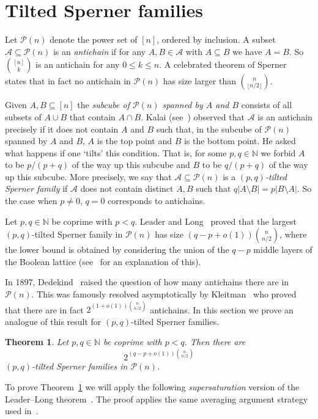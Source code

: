 \documentclass[11pt]{article}
\newtheorem{theorem}{Theorem}[section]
\numberwithin{equation}{section}
\def\A{\mathcal{A}}
\def\P{\mathcal{P}}
\begin{document}
\section{Tilted Sperner families}\label{sec:tilt}
Let $\P(n)$ denote the power set of $[n]$,  ordered by inclusion. A subset $\A \subseteq \P(n)$ is an \emph{antichain} if for any $A, B \in \A$ with $A \subseteq B$ we have $A = B$. So $\binom{[n]}{k}$ is an antichain for any $0 \leq k \leq n$. A celebrated theorem of  Sperner~\cite{sperner} states that in fact no antichain in $\P(n)$ has size larger than $\binom{n}{\lfloor n/2 \rfloor}$. 

Given $A,B \subseteq [n]$ the \emph{subcube of $\P(n)$ spanned by $A$ and $B$} consists of all subsets of $A\cup B$ that contain $A\cap B$.
Kalai (see~\cite{long}) observed that $\mathcal A$ is an antichain precisely if it does not contain $A$ and $B$ such that, in the subcube of $\P(n)$ spanned by $A$ and $B$, $A$ is the top point and $B$ is the bottom point. He asked what happens if one `tilts' this condition. That is, for some $p,q \in \mathbb N$ we forbid $A$ to be $p/(p+q)$ of the way up this subcube and $B$ to be $q/(p+q)$ of the way up this subcube.
More precisely, we say that $\A \subseteq \P(n)$ is a \emph{$(p,q)$-tilted Sperner family} if $\A$ does not contain distinct $A,B$ such that $q|A\setminus B|=p|B\setminus A|$. So the case when $p\not = 0$, $q=0$ corresponds to antichains. 


Let  $p,q\in \mathbb N$ be coprime with $p<q$. Leader and Long~\cite{long} proved that the largest $(p,q)$-tilted Sperner family in $\P(n)$ has size $(q-p+o(1))\binom{n}{n/2}$, where the lower bound is obtained by considering the union of the $q-p$ middle layers of the Boolean lattice (see~\cite{long} for an explanation of this).




In 1897, Dedekind~\cite{dedekindsperner} raised the question of how many antichains there are in $\P(n)$. This was famously resolved asymptotically by Kleitman~\cite{kleitmansperner} who proved that there are in fact 
$2^{(1+o(1))\binom{n}{n/2}}$ antichains. In this section we prove an analogue of this result for $(p,q)$-tilted Sperner families.

\begin{theorem}\label{tilt}
Let $p,q\in \mathbb N$ be coprime with $p<q$. Then there are 
$$2^{(q-p+o(1))\binom{n}{n/2}}$$
$(p,q)$-tilted Sperner families in $\P(n)$.
\end{theorem}
To prove Theorem~\ref{tilt} we will apply the following \emph{supersaturation} version of the Leader--Long theorem~\cite{long}. The proof applies the same  averaging argument strategy used in~\cite{long}.
\end{document}
